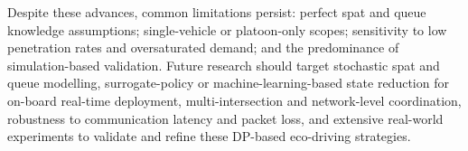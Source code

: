 Despite these advances, common limitations persist: perfect \ac{spat} and queue knowledge assumptions; single-vehicle or platoon-only scopes; sensitivity to low penetration rates and oversaturated demand; and the predominance of simulation-based validation. Future research should target stochastic \ac{spat} and queue modelling, surrogate-policy or machine-learning-based state reduction for on-board real-time deployment, multi-intersection and network-level coordination, robustness to communication latency and packet loss, and extensive real-world experiments to validate and refine these DP-based eco-driving strategies.
